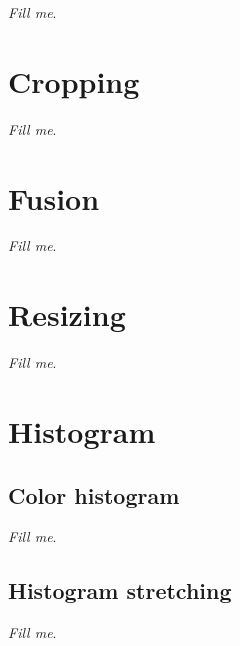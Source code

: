 \documentclass{report}
\begin{document}
		\textit{Fill me}.

\section{Cropping}

	\textit{Fill me}.

\section{Fusion}

	\textit{Fill me}.

\section{Resizing}

	\textit{Fill me}.

\section{Histogram}

	\subsection{Color histogram}

		\textit{Fill me}.

	\subsection{Histogram stretching}

		\textit{Fill me}.
\end{document}

